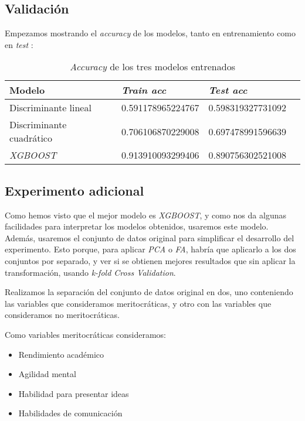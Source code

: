 \subsection{Validación}

Empezamos mostrando el \textit{accuracy} de los modelos, tanto en entrenamiento como en \textit{test} \footnotemark:


\begin{table}[H]
\centering
\begin{tabular}{|l|l|l|l}
\hline
    Modelo               & \textit{Train acc} & \textit{Test acc}          \\
\hline
Discriminante lineal     & 0.591178965224767  & 0.598319327731092 \\
Discriminante cuadrático & 0.706106870229008  & 0.697478991596639 \\
\textit{XGBOOST}         & 0.913910093299406  & 0.890756302521008 \\
\hline
\end{tabular}
\caption{\textit{Accuracy} de los tres modelos entrenados}
\end{table}

\subsection{Experimento adicional}

Como hemos visto que el mejor modelo es \textit{XGBOOST}, y como nos da algunas facilidades para interpretar los modelos obtenidos, usaremos este modelo. Además, usaremos el conjunto de datos original para simplificar el desarrollo del experimento. Esto porque, para aplicar \textit{PCA} o \textit{FA}, habría que aplicarlo a los dos conjuntos por separado, y ver si se obtienen mejores resultados que sin aplicar la transformación, usando \textit{k-fold Cross Validation}.

Realizamos la separación del conjunto de datos original en dos, uno conteniendo las variables que consideramos meritocráticas, y otro con las variables que consideramos no meritocráticas.

Como variables meritocráticas consideramos:

\begin{itemize}
    \item Rendimiento académico
    \item Agilidad mental
    \item Habilidad para presentar ideas
    \item Habilidades de comunicación
\end{itemize}

